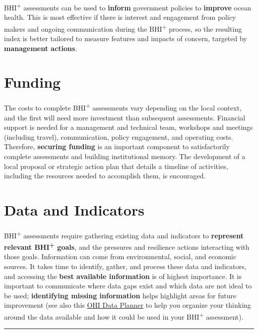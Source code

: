 \documentclass[
]{book}
\begin{document}
BHI\textsuperscript{+} assessments can be used to \textbf{inform} government policies to \textbf{improve} ocean health. This is most effective if there is interest and engagement from policy makers and ongoing communication during the BHI\textsuperscript{+} process, so the resulting index is better tailored to measure features and impacts of concern, targeted by \textbf{management actions}.

\hypertarget{funding}{%
\section{Funding}\label{funding}}

The costs to complete BHI\textsuperscript{+} assessments vary depending on the local context, and the first will need more investment than subsequent assessments. Financial support is needed for a management and technical team, workshops and meetings (including travel), communication, policy engagement, and operating costs. Therefore, \textbf{securing funding} is an important component to satisfactorily complete assessments and building institutional memory. The development of a local proposal or strategic action plan that details a timeline of activities, including the resources needed to accomplish them, is encouraged.

\hypertarget{data-and-indicators}{%
\section{Data and Indicators}\label{data-and-indicators}}

BHI\textsuperscript{+} assessments require gathering existing data and indicators to \textbf{represent relevant BHI\textsuperscript{+} goals}, and the pressures and resilience actions interacting with those goals. Information can come from environmental, social, and economic sources.
It takes time to identify, gather, and process these data and indicators, and accessing the \textbf{best available information} is of highest importance. It is important to communicate where data gaps exist and which data are not ideal to be used; \textbf{identifying missing information} helps highlight areas for future improvement (see also this \href{https://docs.google.com/spreadsheets/d/1f-vwUrQHrMs7cjhChuK2YnlbkE_5kQ6AgGwyV2eJ1vA/edit\#gid=1485393150}{OHI Data Planner} to help you organize your thinking around the data available and how it could be used in your BHI\textsuperscript{+} assessment).

\begin{center}\rule{0.5\linewidth}{0.5pt}\end{center}
\end{document}
